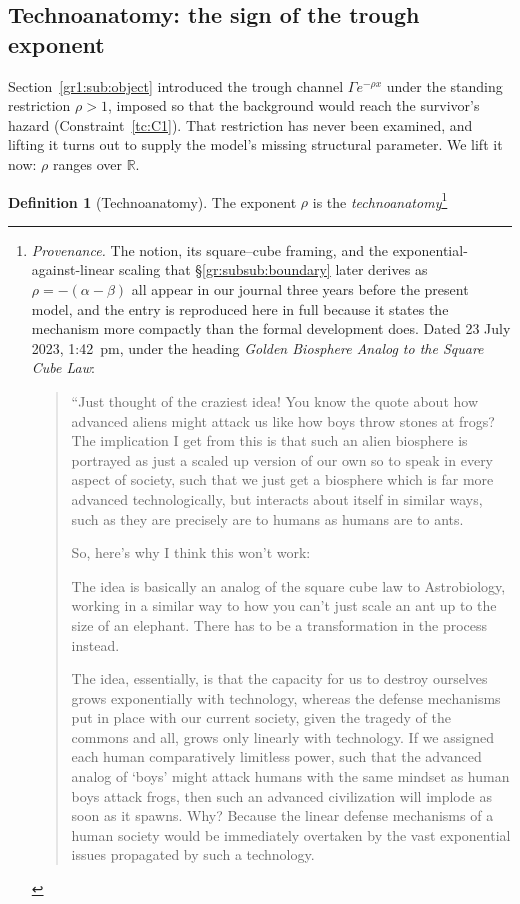 \documentclass[11pt]{article}
\numberwithin{equation}{section}
\theoremstyle{plain}
\theoremstyle{definition}
\newtheorem{definition}[theorem]{Definition}
\theoremstyle{remark}
\newcommand{\R}{\mathbb{R}}
\begin{document}
\subsection{Technoanatomy: the sign of the trough exponent}
\label{gr1:sub:anatomy}

Section~\ref{gr1:sub:object} introduced the trough channel
$\Gamma e^{-\rho x}$ under the standing restriction $\rho>1$, imposed so
that the background would reach the survivor's hazard
(Constraint~\ref{tc:C1}). That restriction has never been examined, and
lifting it turns out to supply the model's missing structural
parameter. We lift it now: $\rho$ ranges over $\R$.

\begin{definition}[Technoanatomy]\label{gr1:def:anatomy}
The exponent $\rho$ is the \emph{technoanatomy}\footnote{%
\emph{Provenance.} The notion, its square--cube framing, and the
exponential-against-linear scaling that
\S\ref{gr:subsub:boundary} later derives as $\rho=-(\alpha-\beta)$ all appear in
our journal three years before the present model, and the entry
is reproduced here in full because it states the mechanism more
compactly than the formal development does. Dated 23 July 2023,
1:42~pm, under the heading \emph{Golden Biosphere Analog to the Square
Cube Law}:
\begin{quote}\small
``Just thought of the craziest idea! You know the quote about how
advanced aliens might attack us like how boys throw stones at frogs? The
implication I get from this is that such an alien biosphere is portrayed
as just a scaled up version of our own so to speak in every aspect of
society, such that we just get a biosphere which is far more advanced
technologically, but interacts about itself in similar ways, such as
they are precisely are to humans as humans are to ants.

So, here's why I think this won't work:

The idea is basically an analog of the square cube law to
Astrobiology, working in a similar way to how you can't just scale an
ant up to the size of an elephant. There has to be a transformation in
the process instead.

The idea, essentially, is that the capacity for us to destroy ourselves
grows exponentially with technology, whereas the defense mechanisms put
in place with our current society, given the tragedy of the commons and
all, grows only linearly with technology. If we assigned each human
comparatively limitless power, such that the advanced analog of
`boys' might attack humans with the same mindset as human boys attack
frogs, then such an advanced civilization will implode as soon as it
spawns. Why? Because the linear defense mechanisms of a human society
would be immediately overtaken by the vast exponential issues propagated
by such a technology.


\end{quote}}
\end{definition}
\end{document}
